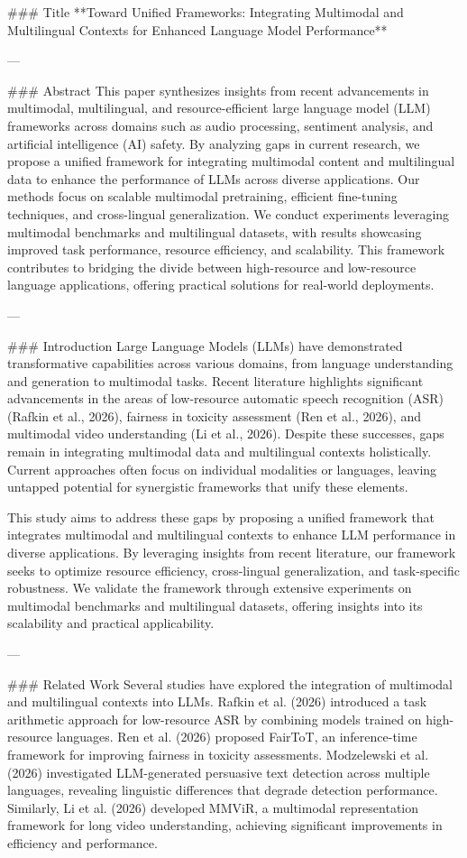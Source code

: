 ### Title  
**Toward Unified Frameworks: Integrating Multimodal and Multilingual Contexts for Enhanced Language Model Performance**

---

### Abstract  
This paper synthesizes insights from recent advancements in multimodal, multilingual, and resource-efficient large language model (LLM) frameworks across domains such as audio processing, sentiment analysis, and artificial intelligence (AI) safety. By analyzing gaps in current research, we propose a unified framework for integrating multimodal content and multilingual data to enhance the performance of LLMs across diverse applications. Our methods focus on scalable multimodal pretraining, efficient fine-tuning techniques, and cross-lingual generalization. We conduct experiments leveraging multimodal benchmarks and multilingual datasets, with results showcasing improved task performance, resource efficiency, and scalability. This framework contributes to bridging the divide between high-resource and low-resource language applications, offering practical solutions for real-world deployments.

---

### Introduction  
Large Language Models (LLMs) have demonstrated transformative capabilities across various domains, from language understanding and generation to multimodal tasks. Recent literature highlights significant advancements in the areas of low-resource automatic speech recognition (ASR) (Rafkin et al., 2026), fairness in toxicity assessment (Ren et al., 2026), and multimodal video understanding (Li et al., 2026). Despite these successes, gaps remain in integrating multimodal data and multilingual contexts holistically. Current approaches often focus on individual modalities or languages, leaving untapped potential for synergistic frameworks that unify these elements.

This study aims to address these gaps by proposing a unified framework that integrates multimodal and multilingual contexts to enhance LLM performance in diverse applications. By leveraging insights from recent literature, our framework seeks to optimize resource efficiency, cross-lingual generalization, and task-specific robustness. We validate the framework through extensive experiments on multimodal benchmarks and multilingual datasets, offering insights into its scalability and practical applicability.

---

### Related Work  
Several studies have explored the integration of multimodal and multilingual contexts into LLMs. Rafkin et al. (2026) introduced a task arithmetic approach for low-resource ASR by combining models trained on high-resource languages. Ren et al. (2026) proposed FairToT, an inference-time framework for improving fairness in toxicity assessments. Modzelewski et al. (2026) investigated LLM-generated persuasive text detection across multiple languages, revealing linguistic differences that degrade detection performance. Similarly, Li et al. (2026) developed MMViR, a multimodal representation framework for long video understanding, achieving significant improvements in efficiency and performance.

